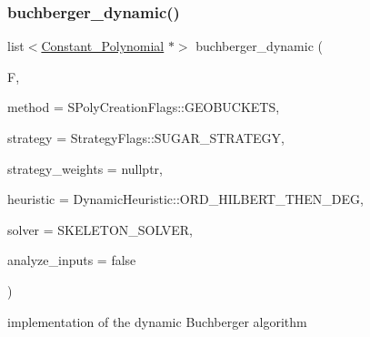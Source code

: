 \subsubsection{\texorpdfstring{buchberger\+\_\+dynamic()}{buchberger\_dynamic()}}
{\footnotesize\ttfamily list$<$\hyperlink{group__polygroup_class_constant___polynomial}{Constant\+\_\+\+Polynomial} $\ast$$>$ buchberger\+\_\+dynamic (\begin{DoxyParamCaption}\item[{const list$<$ \hyperlink{group__polygroup_class_abstract___polynomial}{Abstract\+\_\+\+Polynomial} $\ast$$>$ \&}]{F,  }\item[{\hyperlink{group___g_b_computation_ga73257b8a2d5cc826853a71b77d0cebf2}{S\+Poly\+Creation\+Flags}}]{method = {\ttfamily SPolyCreationFlags\+:\+:GEOBUCKETS},  }\item[{\hyperlink{group__strategygroup_ga0ee6c8e033547330e6b89929730007f4}{Strategy\+Flags}}]{strategy = {\ttfamily StrategyFlags\+:\+:SUGAR\+\_\+STRATEGY},  }\item[{W\+T\+\_\+\+T\+Y\+PE $\ast$}]{strategy\+\_\+weights = {\ttfamily nullptr},  }\item[{\hyperlink{group___g_b_computation_ga498e6d10e581ed9dca25264cbe825ce0}{Dynamic\+Heuristic}}]{heuristic = {\ttfamily DynamicHeuristic\+:\+:ORD\+\_\+HILBERT\+\_\+THEN\+\_\+DEG},  }\item[{\hyperlink{group___g_b_computation_ga28fbbb9eb7d8b80ced05c8fa89b2bdac}{Dynamic\+Solver}}]{solver = {\ttfamily SKELETON\+\_\+SOLVER},  }\item[{bool}]{analyze\+\_\+inputs = {\ttfamily false} }\end{DoxyParamCaption})}



implementation of the dynamic Buchberger algorithm 


